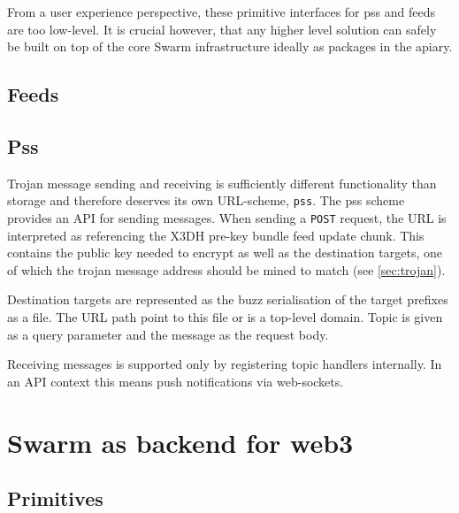 From a user experience perspective, these  primitive interfaces for pss and feeds are too low-level. It is  crucial however, that any higher level solution can safely be built on top of the core Swarm infrastructure ideally as packages in the apiary.

\subsection{Feeds \statusorange}\label{sec:feeds-ux}


\subsection{Pss \statusorange}\label{sec:pss-ux}

Trojan message sending and receiving is sufficiently different functionality than storage and therefore deserves its  own URL-scheme, \lstinline{pss}. The pss scheme provides an API for sending messages. When sending a \lstinline{POST} request, the URL is interpreted as referencing the X3DH pre-key bundle feed update chunk. This contains the public key needed to encrypt as well as the destination targets,    one of which the trojan message address should be mined to  match (see \ref{sec:trojan}). 

Destination targets are represented as the buzz serialisation of the target prefixes as a file. The URL path point to this file or is a top-level domain. Topic is given as a query parameter and the message as the request body.

Receiving messages is supported only by registering topic handlers internally. In an API context this means push notifications via web-sockets.



\section{Swarm as backend for web3 \statusred}\label{sec:buzz-apiary}

\subsection{Primitives \statusred}\label{sec:primitives}



